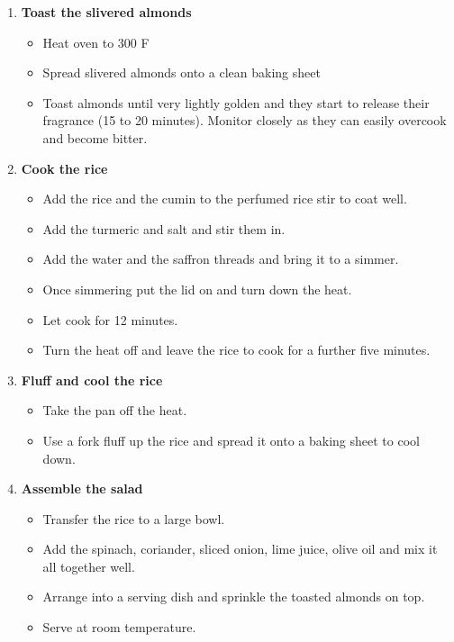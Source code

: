 \documentclass[11pt,letterpaper]{article}
\begin{document}
\begin{description}
\begin{enumerate}
	\item {\bf Toast the slivered almonds }
	\begin{itemize}
	\item Heat oven to 300 F
	\item Spread slivered almonds onto a clean baking sheet
	\item Toast almonds until very lightly golden and they start to release their fragrance (15 to 20 minutes). Monitor closely as they can easily overcook and become bitter.
	\end{itemize}
	
	\item {\bf Cook the rice }
	\begin{itemize}
	\item Add the rice and the cumin to the perfumed rice stir to coat well.
	\item Add the turmeric and salt and stir them in. 
	\item Add the water and the saffron threads and bring it to a simmer. 
	\item Once simmering put the lid on and turn down the heat. 
	\item Let cook for 12 minutes. 
	\item Turn the heat off and leave the rice to cook for a further five minutes.
	\end{itemize}
		
	\item {\bf Fluff and cool the rice}
	\begin{itemize}
	\item Take the pan off the heat. 
	\item Use a fork fluff up the rice and spread it onto a baking sheet to cool down.
	\end{itemize}
	
	\item {\bf Assemble the salad}
	\begin{itemize}
	\item Transfer the rice to a large bowl. 
	\item Add the spinach, coriander, sliced onion, lime juice, olive oil and mix it all together well.
	\item Arrange into a serving dish and sprinkle the toasted almonds on top.
	\item Serve at room temperature.
	\end{itemize}

	\end{enumerate}
\end{description}
\end{document}
